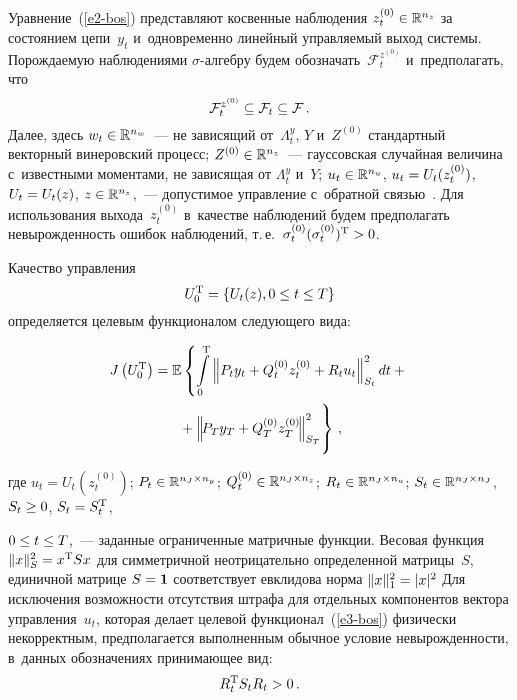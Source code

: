 \begin{multicols}{2}
     
     Уравнение~(\ref{e2-bos}) представляют косвенные наблюдения 
     $z_t^{(0)}\hm\in \mathbb{R}^{n_z}$ за состоянием цепи~$y_t$ 
и~одновременно линейный управляемый выход системы. Порождаемую 
наблюдениями $\sigma$-ал\-геб\-ру будем 
обозначать~$\mathcal{F}_t^{z^{(0)}}$ и~предполагать, что 
$$
\mathcal{F}_t^{z^{(0)}} \hm\subseteq \mathcal{F}_t\hm\subseteq 
\mathcal{F}\,.
$$
 Далее, здесь $w_t\hm\in \mathbb{R}^{n_w}$~--- не зависящий 
от~$\Lambda_t^y$, $Y$ и~$Z^{(0)}$ стандартный векторный винеровский 
процесс; $Z^{(0)}\hm\in \mathbb{R}^{n_z}$~--- гауссовская случайная 
величина с~известными моментами, не зависящая от $\Lambda_t^y$ и~$Y$; 
$u_t\hm\in \mathbb{R}^{n_u}$, $u_t\hm= U_t(z_t^{(0)})$, $U_t\hm= U_t(z)$, 
$z\hm\in \mathbb{R}^{n_z}$,~--- допустимое управление с~обратной 
связью~\cite{5-bos}. Для использования выхода~$z_t^{(0)}$ в~качестве 
наблюдений будем предполагать невырожденность ошибок наблюдений, 
т.\,е.\ $\sigma_t^{(0)}(\sigma_t^{(0)})^{\mathrm{T}}\hm>0$.
     
     Качество управления 
     $$
     U_0^{\mathrm{T}}\hm= \left\{ U_t(z), 0\leq t\hm\leq T\right\}
     $$ 
определяется целевым функционалом следующего вида:

\vspace*{-4pt}

\noindent
     \begin{multline}
     J\left(U_0^{\mathrm{T}}\right)=\mathbb{E}\left\{ 
     \int\limits_0^{\mathrm{T}} \left\| P_t y_t+Q_t^{(0)} 
z_t^{(0)} +R_t u_t\right\|^2_{S_t}dt+{}\right.\\
     \left.{}+\left\| \! P_T y_T +Q_T^{(0)} z_T^{(0)}\!\right\|^2_{S_T}\!
     \vphantom{\int\limits_0^{\mathrm{T}}}
     \right\}\,,
     \label{e3-bos}
     \end{multline}
     
          \vspace*{-2pt}

\noindent     
где $u_t=U_t(z_t^{(0)})$; $P_t\hm\in \mathbb{R}^{n_J\times n_y}$; 
$Q_t^{(0)}\hm\in \mathbb{R}^{n_J\times n_z}$; $R_t\hm\in 
\mathbb{R}^{n_J\times n_u}$; $S_t\hm\in \mathbb{R}^{n_J\times n_J}$, 
$S_t\hm\geq 0$, $S_t\hm= S_t^{\mathrm{T}}$,\linebreak\vspace*{-12pt}

\columnbreak

\noindent
 $0\hm\leq t\hm\leq T$,~--- заданные 
ограниченные матричные функции. Весовая функция $\|x\|_S^2 \hm= 
x^{\mathrm{T}} Sx$ для симметричной неотрицательно определенной 
мат\-ри\-цы~$S$, единичной матрице $S\hm=\mathbf{1}$ соответствует 
евклидова норма $\| x\|^2_1\hm= \vert x\vert^2$ Для исключения 
возможности отсутствия штрафа для отдельных компонентов вектора 
управления~$u_t$, которая делает целевой функционал~(\ref{e3-bos}) 
физически некорректным, предполагается выполненным обычное условие 
невырожденности, в~данных обозначениях принимающее вид: 
$$
R_t^{\mathrm{T}} S_t R_t\hm>0\,.
$$
     

\end{multicols}
